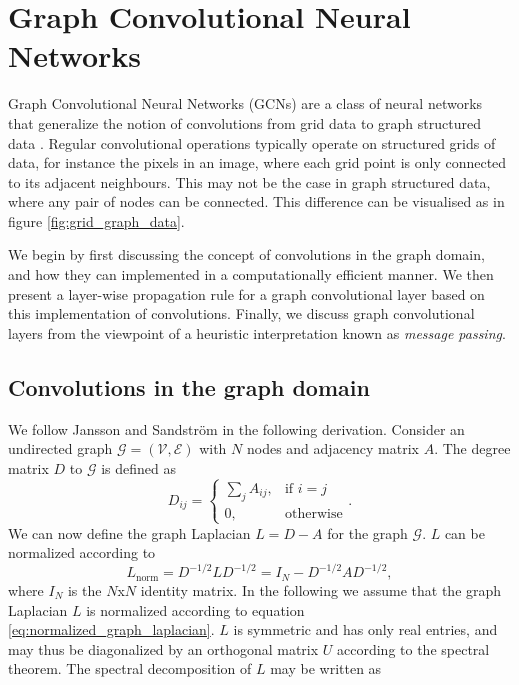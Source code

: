 \section{Graph Convolutional Neural Networks}

Graph Convolutional Neural Networks (GCNs) are a class of neural networks that generalize the notion of convolutions from grid data to graph structured data \cite{wu_review}. Regular convolutional operations typically operate on structured grids of data, for instance the pixels in an image, where each grid point is only connected to its adjacent neighbours. This may not be the case in graph structured data, where any pair of nodes can be connected. This difference can be visualised as in figure \ref{fig:grid_graph_data}. 

We begin by first discussing the concept of convolutions in the graph domain, and how they can implemented in a computationally efficient manner. We then present a layer-wise propagation rule for a graph convolutional layer based on this implementation of convolutions. Finally, we discuss graph convolutional layers from the viewpoint of a heuristic interpretation known as \textit{message passing}.

\subsection{Convolutions in the graph domain}

We follow Jansson and Sandström \cite{jansson_sandstrom} in the following derivation. Consider an undirected graph $\mathcal{G} = (\mathcal{V}, \mathcal{E})$ with $N$ nodes and adjacency matrix $A$. The degree matrix $D$ to $\mathcal{G}$ is defined as 
\begin{equation}
    D_{ij} = \begin{cases} \sum_j A_{ij}, & \mbox{if } i = j \\ \mbox{0,} & \mbox{otherwise} \end{cases}.
    \label{eq:degreematrixdefinition}
\end{equation}
We can now define the graph Laplacian $L= D-A $ for the graph $\mathcal{G}$. $L$ can be normalized according to 
\begin{equation}
    L_\text{norm} = D^{-1/2} L D^{-1/2} =  I_N - D^{-1/2} A D^{-1/2},
    \label{eq:normalized_graph_laplacian}
\end{equation}
where $I_N$ is the $N$x$N$ identity matrix. In the following we assume that the graph Laplacian $L$ is normalized according to equation \eqref{eq:normalized_graph_laplacian}. $L$ is symmetric and has only real entries, and may thus be diagonalized by an orthogonal matrix $U$ according to the spectral theorem. The spectral decomposition of $L$ may be written as 

